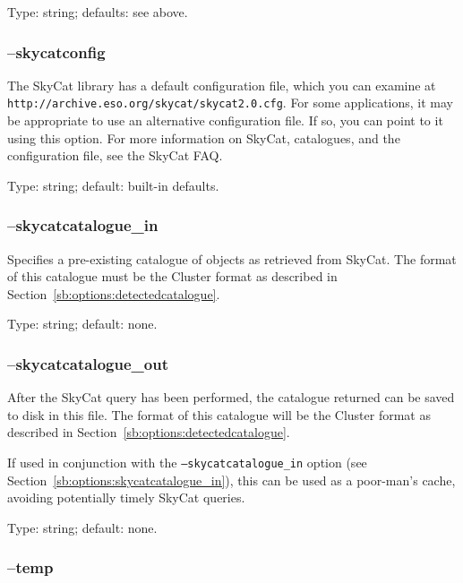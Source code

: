 \documentclass[twoside,11pt]{article}
\newcommand{\htmladdnormallink}[2]{#1}
\newcommand{\xlabel}[1]{}
\newcommand{\SkyCatFAQ}{\htmladdnormallink{SkyCat FAQ}{http://archive.eso.org/skycat/skycat-faq.html}}
\begin{document}
Type: string; defaults: see above.

\subsubsection{\xlabel{sb_options_skycatconfig}--skycatconfig\label{sb:options:skycatconfig}}

The SkyCat library has a default configuration file, which you can examine at
\texttt{http://archive.eso.org/skycat/skycat2.0.cfg}.  For some applications,
it may be appropriate to use an alternative configuration file.  If so, you
can point to it using this option.  For more information on SkyCat,
catalogues, and the configuration file, see the \SkyCatFAQ.

Type: string; default: built-in defaults.

\subsubsection{\xlabel{sb_options_skycatcatalogue_in}--skycatcatalogue\_in\label{sb:options:skycatcatalogue_in}}

Specifies a pre-existing catalogue of objects as retrieved from SkyCat. The
format of this catalogue must be the Cluster format as described in
Section~\ref{sb:options:detectedcatalogue}.

Type: string; default: none.

\subsubsection{\xlabel{sb_options_skycatcatalogue_out}--skycatcatalogue\_out\label{sb:options:skycatalogue_out}}

After the SkyCat query has been performed, the catalogue returned can be saved
to disk in this file. The format of this catalogue will be the Cluster format
as described in Section~\ref{sb:options:detectedcatalogue}.

If used in conjunction with the \texttt{--skycatcatalogue\_in} option (see
Section~\ref{sb:options:skycatcatalogue_in}), this can be used as a poor-man's
cache, avoiding potentially timely SkyCat queries.

Type: string; default: none.

\subsubsection{\xlabel{sb_options_temp}--temp\label{sb:options:temp}}
\end{document}
